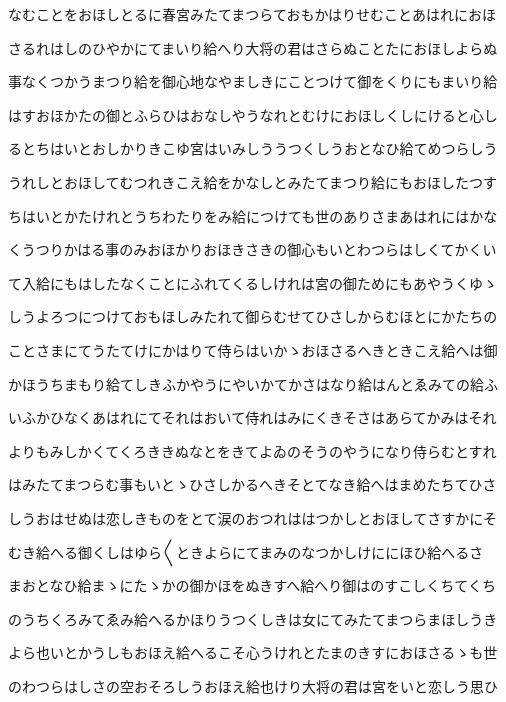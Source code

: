 \documentclass[a4paper,11pt,landscape]{ltjtarticle}
\begin{document}
\par\medskip
なむことをおほしとるに春宮みたてまつらておもかはりせむことあはれにおほ
\par\medskip
さるれはしのひやかにてまいり給へり大将の君はさらぬことたにおほしよらぬ
\par\medskip
事なくつかうまつり給を御心地なやましきにことつけて御をくりにもまいり給
\par\medskip
はすおほかたの御とふらひはおなしやうなれとむけにおほしくしにけると心し
\par\medskip
るとちはいとおしかりきこゆ宮はいみしううつくしうおとなひ給てめつらしう
\par\medskip
うれしとおほしてむつれきこえ給をかなしとみたてまつり給にもおほしたつす
\par\medskip
ちはいとかたけれとうちわたりをみ給につけても世のありさまあはれにはかな
\par\medskip
くうつりかはる事のみおほかりおほきさきの御心もいとわつらはしくてかくい
\par\medskip
て入給にもはしたなくことにふれてくるしけれは宮の御ためにもあやうくゆゝ
\par\medskip
しうよろつにつけておもほしみたれて御らむせてひさしからむほとにかたちの
\par\medskip
ことさまにてうたてけにかはりて侍らはいかゝおほさるへきときこえ給へは御
\par\medskip
かほうちまもり給てしきふかやうにやいかてかさはなり給はんとゑみての給ふ
\par\medskip
いふかひなくあはれにてそれはおいて侍れはみにくきそさはあらてかみはそれ
\par\medskip
よりもみしかくてくろききぬなとをきてよゐのそうのやうになり侍らむとすれ
\par\medskip
はみたてまつらむ事もいとゝひさしかるへきそとてなき給へはまめたちてひさ
\par\medskip
しうおはせぬは恋しきものをとて涙のおつれははつかしとおほしてさすかにそ
\par\medskip
むき給へる御くしはゆら〱ときよらにてまみのなつかしけににほひ給へるさ
\par\medskip
まおとなひ給まゝにたゝかの御かほをぬきすへ給へり御はのすこしくちてくち
\par\medskip
のうちくろみてゑみ給へるかほりうつくしきは女にてみたてまつらまほしうき
\par\medskip
よら也いとかうしもおほえ給へるこそ心うけれとたまのきすにおほさるゝも世
\par\medskip
のわつらはしさの空おそろしうおほえ給也けり大将の君は宮をいと恋しう思ひ
\end{document}
